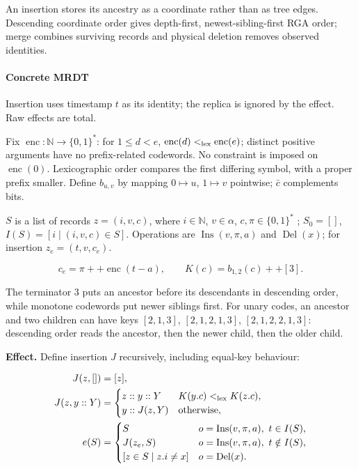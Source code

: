 




An insertion stores its ancestry as a coordinate rather than as tree edges. Descending coordinate order gives depth-first, newest-sibling-first RGA order; merge combines surviving records and physical deletion removes observed identities.

\paragraph{Concrete MRDT}
Insertion uses timestamp $t$ as its identity; the replica is ignored by the effect. Raw effects are total.

Fix $\operatorname{enc}:\mathbb N\to\{0,1\}^*$: for $1\le d<e$, $\operatorname{enc}(d)<_{\rm lex}\operatorname{enc}(e)$; distinct positive arguments have no prefix-related codewords. No constraint is imposed on $\operatorname{enc}(0)$. Lexicographic order compares the first differing symbol, with a proper prefix smaller. Define $b_{u,v}$ by mapping $0\mapsto u$, $1\mapsto v$ pointwise; $\bar c$ complements bits.

$S$ is a list of records $z=(i,v,c)$, where $i\in\mathbb N$, $v\in\alpha$, $c,\pi\in\{0,1\}^*$ ; $S_0=[]$, $I(S)=[i\mid(i,v,c)\in S]$. Operations are $\operatorname{Ins}(v,\pi,a)$ and $\operatorname{Del}(x)$; for insertion $z_e=(t,v,c_e)$.

\[
c_e=\pi++\operatorname{enc}(t-a),\qquad K(c)=b_{1,2}(c)++[3].
\]

The terminator $3$ puts an ancestor before its descendants in descending
order, while monotone codewords put newer siblings first. For unary codes,
an ancestor and two children can have keys $[2,1,3]$,
$[2,1,2,1,3]$, $[2,1,2,2,1,3]$: descending order reads the ancestor,
then the newer child, then the older child.


\textbf{Effect.} Define insertion $J$ recursively, including equal-key behaviour:

\[
\begin{aligned}J(z,[])&=[z],\\J(z,y::Y)&=\begin{cases}z::y::Y&K(y.c)<_{\rm lex}K(z.c),\\y::J(z,Y)&\text{otherwise},\end{cases}\\e(S)&=\begin{cases}S&o=\operatorname{Ins}(v,\pi,a),\ t\in I(S),\\J(z_e,S)&o=\operatorname{Ins}(v,\pi,a),\ t\notin I(S),\\{}[z\in S\mid z.i\ne x]&o=\operatorname{Del}(x).\end{cases}\end{aligned}
\]


